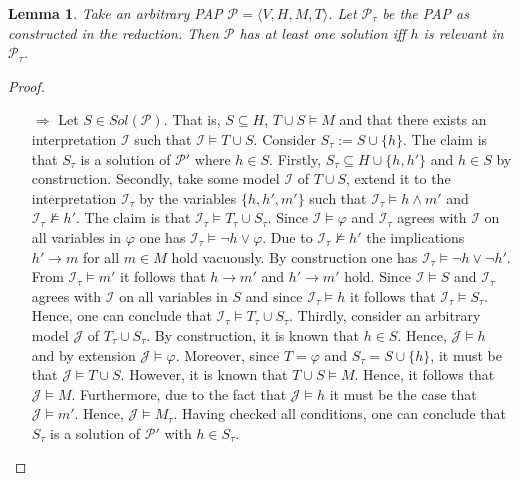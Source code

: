 \documentclass [11pt]{article}
\newcommand{\lto}{\rightarrow}
\newcommand{\nmodels}{\not\models}
\newtheorem{lemma}[theorem]{Lemma}
\begin{document}
\begin{lemma}
\label{lemma:2-equiv1}
Take an arbitrary PAP  $\mathcal{P}=\langle V,H,M,T \rangle$. Let $\mathcal{P}_{\tau}$ be the PAP as constructed in the reduction.  Then $\mathcal{P}$ has at least one
solution iff 
$h$ is relevant in $\mathcal{P}_{\tau}$.
\end{lemma}
\begin{proof}
\begin{itemize}
\item[$\Rightarrow$] Let $S \in Sol(\mathcal{P})$. That is, $S \subseteq H$, $T \cup S \models M$ and that there exists an interpretation $\mathcal{I}$ such that $\mathcal{I} \models T \cup S$. Consider $S_{\tau}:=S \cup \{h\}$. The claim is that $S_{\tau}$ is a solution of $\mathcal{P}'$ where $h \in S$. Firstly, $S_{\tau} \subseteq H \cup\{h, h'\}$ and $h\in S$ by construction. Secondly, take some model $\mathcal{I}$ of $T \cup S$, extend it to the interpretation $\mathcal{I}_{\tau}$ by the variables $\{h,h',m'\}$ such that $\mathcal{I}_{\tau} \models h \land m'$ and $\mathcal{I}_{\tau} \nmodels h'$. The claim is that $\mathcal{I}_{\tau} \models T_{\tau} \cup S_{\tau}$.
Since $\mathcal{I} \models \varphi$ and $\mathcal{I}_{\tau}$ agrees with $\mathcal{I}$ on all variables in $\varphi$ one has $\mathcal{I}_{\tau} \models \neg h \lor \varphi$. Due to  $\mathcal{I}_{\tau}\nmodels h'$ the implications $h' \lto m$ for all $m \in M$ hold vacuously. 
By construction one has $\mathcal{I}_{\tau}\models \neg h \lor \neg h'$. From $\mathcal{I}_{\tau}\models m'$ it follows that $h \lto m'$ and $h' \lto m'$ hold. Since $\mathcal{I} \models S$ and $\mathcal{I}_{\tau}$ agrees with $\mathcal{I}$ on all variables in $S$ and since $\mathcal{I}_{\tau}\models h$ it follows that $\mathcal{I}_{\tau}\models S_{\tau}$. Hence, one can conclude that $\mathcal{I}_{\tau} \models T_{\tau} \cup S_{\tau}$.
Thirdly, consider an arbitrary model  $\mathcal{J}$ of  $T_{\tau} \cup S_{\tau}$. By construction, it is known that $h \in S$. Hence, $\mathcal{J} \models h$ and by extension $\mathcal{J} \models \varphi$. Moreover, since $T = \varphi$ and $S_{\tau}=S \cup  \{h\}$, it must be that $\mathcal{J} \models T \cup S$. However, it is known that $T \cup S \models M$. Hence, it follows that $\mathcal{J} \models M$. Furthermore, due to the fact that $\mathcal{J} \models h$ it must be the case that $\mathcal{J} \models m'$. Hence, $\mathcal{J} \models M_{\tau}$. 
Having checked all conditions, one can conclude that $S_{\tau}$ is a solution of $\mathcal{P}'$ with $h \in S_{\tau}$.



\end{itemize}
\end{proof}
\end{document}
